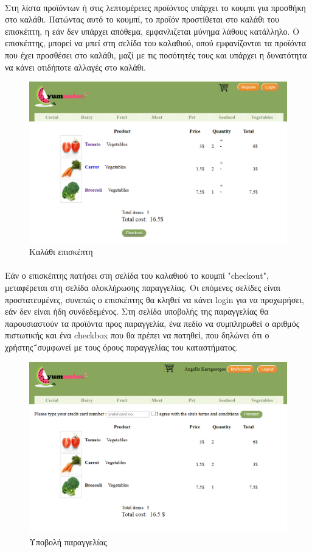 \documentclass[12pt]{article}
\begin{document}
		  \paragraph{}
			Στη λίστα προϊόντων ή στις λεπτομέρειες προϊόντος υπάρχει το κουμπι για προσθήκη στο καλάθι. Πατώντας αυτό το κουμπί, το προϊόν προστίθεται στο καλάθι του επισκέπτη, η εάν δεν υπάρχει απόθεμα, εμφανλιζεται μύνημα λάθους κατάλληλο. Ο επισκέπτης, μπορεί να μπεί στη σελίδα του καλαθιού, οπού εμφανίζονται τα προϊόντα που έχει προσθέσει στο καλάθι, μαζί με τις ποσότητές τους και υπάρχει η δυνατότητα να κάνει οτιδήποτε αλλαγές στο καλάθι. 	
			\begin{figure}[H]
				\centering
				\includegraphics[width=1\textwidth]{cart}
				\caption{Καλάθι επισκέπτη}
			\end{figure}
		  \paragraph{}
			Εάν ο επισκέπτης πατήσει στη σελίδα του καλαθιού το κουμπί "checkout", μεταφέρεται στη σελίδα ολοκλήρωσης παραγγελίας. Οι επόμενες σελίδες είναι προστατευμένες, συνεπώς ο επισκέπτης θα κληθεί να κάνει login για να προχωρήσει, εάν δεν είναι ήδη συνδεδεμένος. Στη σελίδα υποβολής της παραγγελίας θα παρουσιαστούν τα προϊόντα προς παραγγελία, ένα πεδίο να συμπληρωθεί ο αριθμός πιστωτικής και ένα checkbox που θα πρέπει να πατηθεί, που δηλώνει ότι ο χρήστης΅συμφωνεί με τους όρους παραγγελίας του καταστήματος.
			\begin{figure}[H]
				\centering
				\includegraphics[width=1\textwidth]{checkout}
				\caption{Υποβολή παραγγελίας}
			\end{figure}
\end{document}
